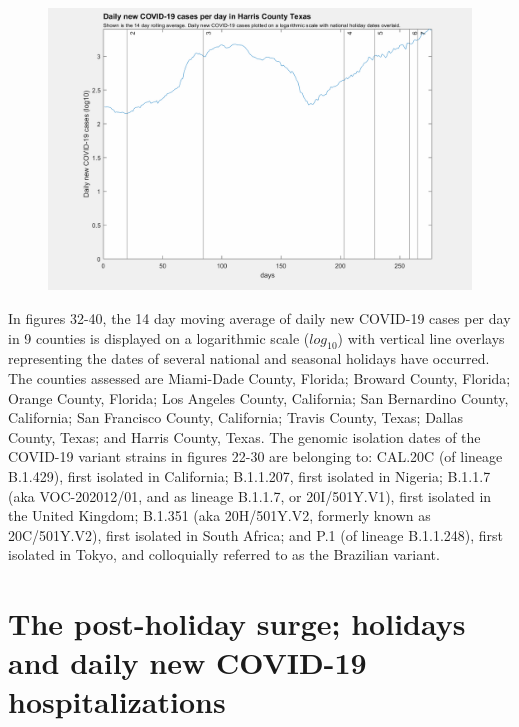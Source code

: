 \documentclass[]{article}
\begin{document}
\begin{figure}[!h]
	\includegraphics[width=\linewidth]{images/harris_cases_holiday_log.png}
	\caption{}
	\label{fig:images/harris_cases_holiday_logLabel}
\end{figure}

\FloatBarrier

In figures 32-40, the 14 day moving average of daily new COVID-19 cases per day in 9 counties is displayed on a logarithmic scale ($log_{10}$) with vertical line overlays representing the dates of several national and seasonal holidays have occurred. The counties assessed are Miami-Dade County, Florida; Broward County, Florida; Orange County, Florida; Los Angeles County, California; San Bernardino County, California; San Francisco County, California; Travis County, Texas; Dallas County, Texas; and Harris County, Texas. The genomic isolation dates of the COVID-19 variant strains in figures 22-30 are belonging to: CAL.20C (of lineage B.1.429), first isolated in California; B.1.1.207, first isolated in Nigeria; B.1.1.7 (aka VOC-202012/01, and as lineage B.1.1.7, or 20I/501Y.V1), first isolated in the United Kingdom; B.1.351 (aka 20H/501Y.V2, formerly known as 20C/501Y.V2), first isolated in South Africa; and P.1 (of lineage B.1.1.248), first isolated in Tokyo, and colloquially referred to as the Brazilian variant.


\FloatBarrier
\vspace{5mm}

\section*{The post-holiday surge; holidays and daily new COVID-19  hospitalizations}
\end{document}
